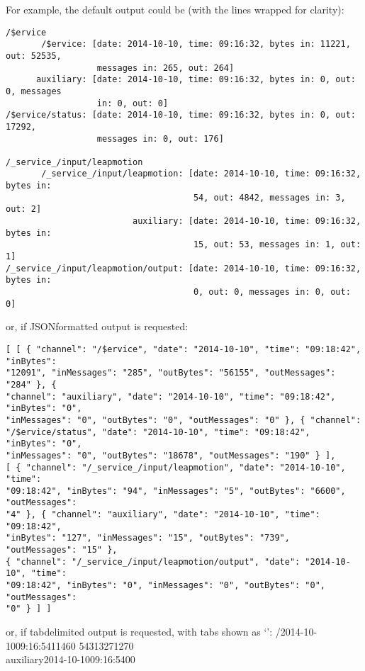 For example, the default output could be (with the lines wrapped for clarity):
\outputBegin
\begin{verbatim}
/$ervice
       /$ervice: [date: 2014-10-10, time: 09:16:32, bytes in: 11221, out: 52535,
                  messages in: 265, out: 264]
      auxiliary: [date: 2014-10-10, time: 09:16:32, bytes in: 0, out: 0, messages
                  in: 0, out: 0]
/$ervice/status: [date: 2014-10-10, time: 09:16:32, bytes in: 0, out: 17292,
                  messages in: 0, out: 176]

/_service_/input/leapmotion
       /_service_/input/leapmotion: [date: 2014-10-10, time: 09:16:32, bytes in:
                                     54, out: 4842, messages in: 3, out: 2]
                         auxiliary: [date: 2014-10-10, time: 09:16:32, bytes in:
                                     15, out: 53, messages in: 1, out: 1]
/_service_/input/leapmotion/output: [date: 2014-10-10, time: 09:16:32, bytes in:
                                     0, out: 0, messages in: 0, out: 0]
\end{verbatim}
\outputEnd
\condPage{}
or, if JSON\longDash{}formatted output is requested:
\outputBegin
\begin{verbatim}
[ [ { "channel": "/$ervice", "date": "2014-10-10", "time": "09:18:42", "inBytes":
"12091", "inMessages": "285", "outBytes": "56155", "outMessages": "284" }, {
"channel": "auxiliary", "date": "2014-10-10", "time": "09:18:42", "inBytes": "0",
"inMessages": "0", "outBytes": "0", "outMessages": "0" }, { "channel":
"/$ervice/status", "date": "2014-10-10", "time": "09:18:42", "inBytes": "0",
"inMessages": "0", "outBytes": "18678", "outMessages": "190" } ],
[ { "channel": "/_service_/input/leapmotion", "date": "2014-10-10", "time":
"09:18:42", "inBytes": "94", "inMessages": "5", "outBytes": "6600", "outMessages":
"4" }, { "channel": "auxiliary", "date": "2014-10-10", "time": "09:18:42",
"inBytes": "127", "inMessages": "15", "outBytes": "739", "outMessages": "15" },
{ "channel": "/_service_/input/leapmotion/output", "date": "2014-10-10", "time":
"09:18:42", "inBytes": "0", "inMessages": "0", "outBytes": "0", "outMessages":
"0" } ] ]
\end{verbatim}
\outputEnd{}
or, if tab\longDash{}delimited output is requested, with tabs shown as `\tabSymbol':
\outputBegin{}
/\dollarService\pseudotab{}2014-10-10\pseudotab{}09:16:54\pseudotab{}11460%
\pseudotab{}54313\pseudotab{}271\pseudotab{}270\\
auxiliary\pseudotab{}2014-10-10\pseudotab{}09:16:54\pseudotab{}0\pseudotab{}0\pseudotab{}%
